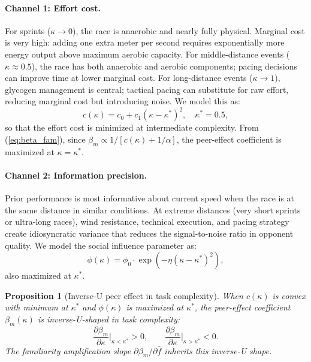 \documentclass[12pt]{article}
\newtheorem{proposition}{Proposition}
\theoremstyle{definition}
\theoremstyle{remark}
\begin{document}
\paragraph{Channel 1: Effort cost.}
For sprints ($\kappa \to 0$), the race is anaerobic and nearly fully physical.
Marginal cost is very high: adding one extra meter per second requires
exponentially more energy output above maximum aerobic capacity.
For middle-distance events ($\kappa \approx 0.5$), the race has both anaerobic
and aerobic components; pacing decisions can improve time at lower marginal
cost.
For long-distance events ($\kappa \to 1$), glycogen management is central;
tactical pacing can substitute for raw effort, reducing marginal cost but
introducing noise.
We model this as:
\begin{equation}
c(\kappa) = c_0 + c_1(\kappa - \kappa^*)^2, \quad \kappa^* = 0.5,
\label{eq:cost_complexity}
\end{equation}
so that the effort cost is minimized at intermediate complexity.
From (\ref{eq:beta_fam}), since $\beta_m \propto 1/[c(\kappa) + 1/\alpha]$,
the peer-effect coefficient is maximized at $\kappa = \kappa^*$.

\paragraph{Channel 2: Information precision.}
Prior performance is most informative about current speed when the race is
at the same distance in similar conditions.
At extreme distances (very short sprints or ultra-long races), wind resistance,
technical execution, and pacing strategy create idiosyncratic variance that
reduces the signal-to-noise ratio in opponent quality.
We model the social influence parameter as:
\begin{equation}
\phi(\kappa) = \phi_0 \cdot \exp\!\left(-\eta(\kappa - \kappa^*)^2\right),
\label{eq:phi_complexity}
\end{equation}
also maximized at $\kappa^*$.

\begin{proposition}[Inverse-U peer effect in task complexity]
\label{prop:complexity}
When $c(\kappa)$ is convex with minimum at $\kappa^*$ and $\phi(\kappa)$ is
maximized at $\kappa^*$, the peer-effect coefficient $\beta_m(\kappa)$ is
inverse-U-shaped in task complexity:
\begin{equation}
\frac{\partial \beta_m}{\partial \kappa}\Big|_{\kappa < \kappa^*} > 0,
\qquad
\frac{\partial \beta_m}{\partial \kappa}\Big|_{\kappa > \kappa^*} < 0.
\end{equation}
The familiarity amplification slope $\partial\beta_m/\partial\bar{f}$ inherits
this inverse-U shape.
\end{proposition}
\end{document}
